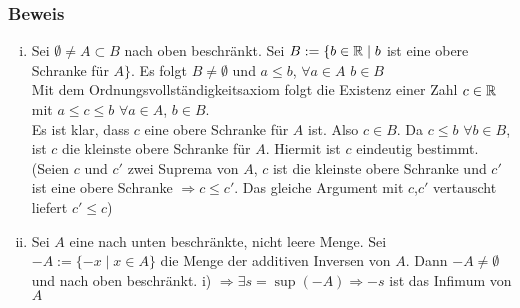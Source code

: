 \subsubsection*{Beweis}
\begin{enumerate}[i)]
\item Sei $\emptyset\not=A\subset B$ nach oben beschränkt. Sei $B:=\{b\in\mathbb{R}\mid b$ ist eine obere Schranke für $A\}$. Es folgt $B\not=\emptyset$ und $a\leq b$, $\forall a\in A$ $b\in B$\\

Mit dem Ordnungsvollständigkeitsaxiom folgt die Existenz einer Zahl $c\in\mathbb{R}$ mit $a\leq c\leq b$ $\forall a\in A$, $b\in B$.\\

Es ist klar, dass $c$ eine obere Schranke für $A$ ist. Also $c\in B$. Da $c\leq b$ $\forall b\in B$, ist $c$ die kleinste obere Schranke für $A$. Hiermit ist  $c$ eindeutig bestimmt.\\

(Seien $c$ und $c'$ zwei Suprema von $A$, $c$ ist die kleinste obere Schranke und $c'$ ist eine obere Schranke $\Rightarrow c\leq c'$. Das gleiche Argument mit $c$,$c'$ vertauscht liefert $c'\leq c$)
\item Sei $A$ eine nach unten beschränkte, nicht leere Menge. Sei $-A:=\{ -x\mid x\in A\}$ die Menge der additiven Inversen von $A$. Dann $-A\not=\emptyset$ und nach oben beschränkt. i) $\Rightarrow \exists s=\sup (-A)\Rightarrow -s$ ist das Infimum von $A$
\end{enumerate}

